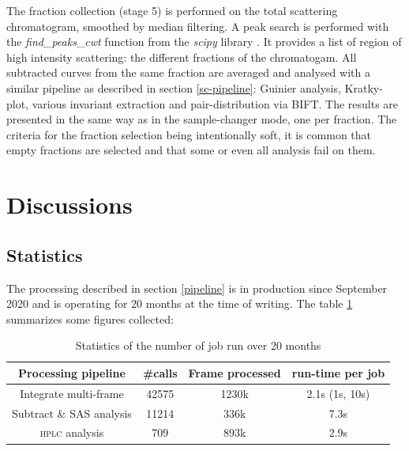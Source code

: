 \documentclass[preprint]{iucr}              %
\begin{document}
The fraction collection (stage 5) is performed on the total scattering chromatogram, smoothed by median filtering. 
A peak search is performed with the \textit{find\_peaks\_cwt} function from the \textit{scipy} library \cite{scipy}.
It provides a list of region of high intensity scattering: the different fractions of the chromatogam.
All subtracted curves from the same fraction are averaged and analysed with a similar pipeline as described in section \ref{sc-pipeline}: Guinier analysis, Kratky-plot, various invariant extraction and pair-distribution via BIFT.
The results are presented in the same way as in the sample-changer mode, one per fraction.
The criteria for the fraction selection being intentionally soft, it is common that empty fractions are selected and that some or even all analysis fail on them. 

\section{Discussions}

\subsection{Statistics}
The processing described in section \ref{pipeline} is in production since September 2020 and is operating for 20 months at the time of writing.
The table \ref{stats} summarizes some figures collected:
\begin{table}
    \label{stats}
    \caption{Statistics of the number of job run over 20 months}
    \begin{center}
    \begin{tabular}{|c|c|c|c|}
        \hline
        Processing pipeline & \#calls & Frame processed & run-time per job \\
        \hline
        Integrate multi-frame & 42575 & 1230k & 2.1s (1s, 10s) \\
        Subtract \& SAS analysis & 11214 & 336k & 7.3s \\
        \textsc{hplc} analysis & 709 & 893k & 2.9s \\
        \hline
    \end{tabular}
    
    \end{center}
\end{table}
\end{document}
